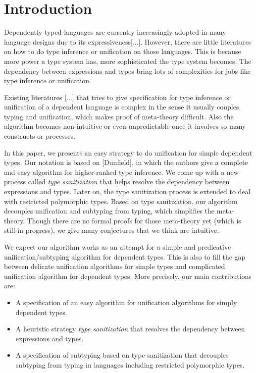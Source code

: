 \section{Introduction}

Dependently typed languages are currently increasingly adopted in many language
designs due to its expressiveness[...]. However, there are little literatures on
how to do type inference or unification on those languages. This is because
more power a type system has, more sophisticated the type system
becomes. The dependency between expressions and types bring lots of complexities
for jobs like type inference or unification.

Existing literatures [...] that tries to give specification for type inference
or unification of
a dependent language is complex in the sense it usually couples typing
and unification, which makes proof of meta-theory difficult.
Also the algorithm becomes non-intuitive or even unpredictable once it involves
so many constructs or processes.

In this paper, we presents an easy strategy to do unification for simple dependent
types. Our notation is based on [Dunfield], in which the authors give a complete
and easy algorithm for higher-ranked type inference. We come up with a new
process called \textit{type sanitization} that helps resolve the dependency
between expressions and types. Later on, the type sanitization process is
extended to deal with restricted polymorphic types.
Based on type sanitization, our algorithm
decouples unification and subtyping from typing, which simplifies the
meta-theory. Though there are no formal proofs for those meta-theory yet (which
is still in progress),
we give many conjectures that we think are intuitive.

We expect our algorithm works as an attempt
for a simple and predicative unification/subtyping algorithm for dependent
types. This is also to
fill the gap between
delicate unification algorithms for simple types
and
complicated unification algorithm for dependent types.
More precisely, our main contributions are:

\begin{itemize}
  \item A specification of an easy algorithm for unification algorithms for
    simply dependent types.
  \item A heuristic strategy \textit{type sanitization} that resolves the
    dependency between expressions and types.
  \item A specification of subtyping based on type sanitization that decouples
      subtyping from typing in languages including restricted polymorphic types.
\end{itemize}